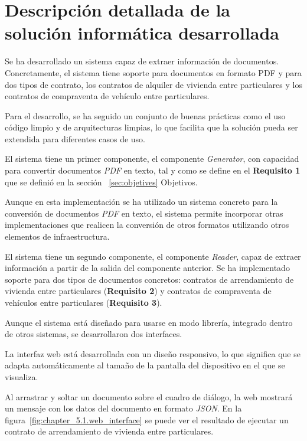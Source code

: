 \section{Descripción detallada de la solución informática desarrollada}

Se ha desarrollado un sistema capaz de extraer información de documentos.
Concretamente, el sistema tiene soporte para documentos en formato PDF y para dos tipos de contrato, los contratos de
alquiler de vivienda entre particulares y los contratos de compraventa de vehículo entre particulares.

Para el desarrollo, se ha seguido un conjunto de buenas prácticas como el uso código limpio y de arquitecturas limpias,
lo que facilita que la solución pueda ser extendida para diferentes casos de uso.

El sistema tiene un primer componente, el componente \textit{Generator}, con capacidad para convertir documentos
\textit{PDF} en texto, tal y como se define en el \textbf{Requisito 1} que se definió en la sección~
\ref{sec:objetives} Objetivos.

Aunque en esta implementación se ha utilizado un sistema concreto para la conversión de documentos \textit{PDF}
en texto, el sistema permite incorporar otras implementaciones que realicen la conversión de otros formatos utilizando
otros elementos de infraestructura.

El sistema tiene un segundo componente, el componente \textit{Reader}, capaz de extraer información a partir de la
salida del componente anterior.
Se ha implementado soporte para dos tipos de documentos concretos: contratos de arrendamiento de vivienda entre
particulares (\textbf{Requisito 2}) y contratos de compraventa de vehículos entre particulares (\textbf{Requisito 3}).

Aunque el sistema está diseñado para usarse en modo librería, integrado dentro de otros sistemas, se desarrollaron dos
interfaces.

La interfaz web está desarrollada con un diseño responsivo, lo que significa que se adapta automáticamente al tamaño de
la pantalla del dispositivo en el que se visualiza.

Al arrastrar y soltar un documento sobre el cuadro de diálogo, la web mostrará un mensaje con los datos del documento en
formato \textit{JSON}.
En la figura~\ref{fig:chapter_5.1.web_interface} se puede ver el resultado de ejecutar un contrato de arrendamiento
de vivienda entre particulares.

